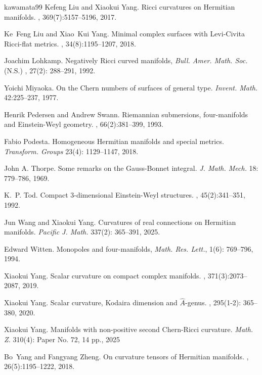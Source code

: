 \documentclass[12pt, reqno]{amsart} \usepackage{pifont} \usepackage{mathrsfs}
\theoremstyle{plain} \newtheorem{thm}{Theorem}[section]
\theoremstyle{definition} \newtheorem{example}[thm]{Example}
\renewcommand{\>}{\rightarrow}
\numberwithin{equation}{section} %
\begin{document}
\begin{thebibliography}{kawamata99}
		 Kefeng Liu and Xiaokui Yang. \newblock Ricci curvatures
		on {H}ermitian manifolds. ,
		369(7):5157--5196, 2017.
		
		 Ke~Feng Liu and Xiao~Kui Yang. \newblock Minimal complex
		surfaces with {L}evi-{C}ivita {R}icci-flat metrics. , 34(8):1195--1207, 2018.
		
		  Joachim Lohkamp.  Negatively Ricci curved manifolds,
		\emph{Bull. Amer. Math. Soc.} (N.S.) , 27(2): 288--291, 1992.
		
		
		Yoichi Miyaoka.  On the Chern numbers of surfaces of general type. \emph{Invent. Math.}   42:225--237, 1977.		
		
		 Henrik Pedersen and Andrew Swann. \newblock
		Riemannian submersions, four-manifolds and {E}instein-{W}eyl geometry.
		, 66(2):381--399, 1993.
		
		 Fabio Podesta. Homogeneous Hermitian manifolds
		and special metrics. \emph{Transform. Groups} 23(4): 1129--1147, 2018.
		
		
		
		 John A. Thorpe.  Some remarks on the Gauss-Bonnet
		integral.  \emph{J. Math. Mech.} 18: 779--786, 1969.
		
		 K.~P. Tod. \newblock Compact {$3$}-dimensional
		{E}instein-{W}eyl structures. ,
		45(2):341--351, 1992.
		
		
		
		 Jun Wang and Xiaokui Yang. \newblock Curvatures of real
		connections on {H}ermitian manifolds. \emph{Pacific J. Math.} 337(2):
		365--391, 2025.
		
		
		Edward Witten.  Monopoles and four-manifolds, \emph{Math. Res. Lett.},  1(6): 769--796, 1994.
		
		
		 Xiaokui Yang. \newblock Scalar curvature on compact
		complex manifolds. , 371(3):2073--2087,
		2019.
		
		 Xiaokui Yang. \newblock Scalar curvature, Kodaira
		dimension and $\hat {A}$-genus. , 295(1-2): 365--380,
		2020.
		
		 Xiaokui Yang.  Manifolds with non-positive second
		Chern-Ricci curvature. \emph{Math. Z.} 310(4): Paper No. 72, 14 pp., 2025
		
		
		
		 Bo~Yang and Fangyang Zheng. \newblock On
		curvature tensors of {H}ermitian manifolds. ,
		26(5):1195--1222, 2018.
		
		
		
	\end{thebibliography}
	
	
\end{document}

